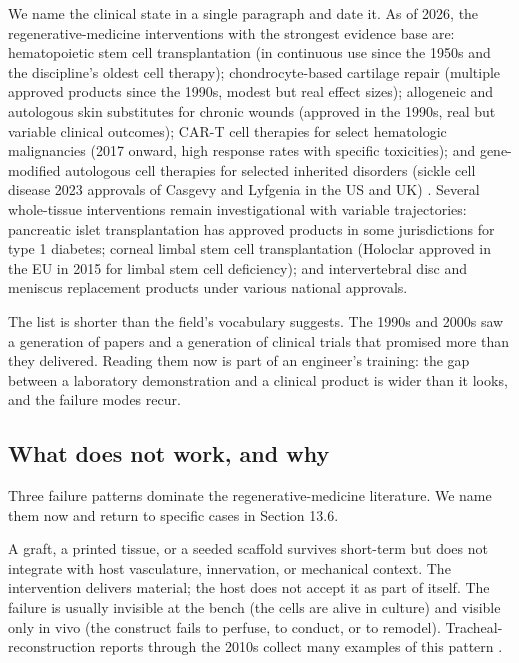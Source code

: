 We name the clinical state in a single paragraph and date it. As of
2026, the regenerative-medicine interventions with the strongest
evidence base are: hematopoietic stem cell transplantation (in
continuous use since the 1950s and the discipline's oldest cell
therapy); chondrocyte-based cartilage repair (multiple approved
products since the 1990s, modest but real effect sizes); allogeneic and
autologous skin substitutes for chronic wounds (approved in the 1990s,
real but variable clinical outcomes); CAR-T cell therapies for select
hematologic malignancies (2017 onward, high response rates with
specific toxicities); and gene-modified autologous cell therapies for
selected inherited disorders (sickle cell disease 2023 approvals of
Casgevy and Lyfgenia in the US and UK)
\cite{paper:v6c13-frangoul-casgevy-2021, paper:v6c13-june-cart-2018}.
Several whole-tissue interventions remain investigational with variable
trajectories: pancreatic islet transplantation has approved products in
some jurisdictions for type 1 diabetes; corneal limbal stem cell
transplantation (Holoclar approved in the EU in 2015 for limbal stem
cell deficiency); and intervertebral disc and meniscus replacement
products under various national approvals.

The list is shorter than the field's vocabulary suggests. The 1990s and
2000s saw a generation of papers and a generation of clinical trials
that promised more than they delivered. Reading them now is part of an
engineer's training: the gap between a laboratory demonstration and a
clinical product is wider than it looks, and the failure modes recur.

\subsection{What does not work, and why}

Three failure patterns dominate the regenerative-medicine literature.
We name them now and return to specific cases in Section 13.6.

 A graft, a printed tissue, or a
seeded scaffold survives short-term but does not integrate with host
vasculature, innervation, or mechanical context. The intervention
delivers material; the host does not accept it as part of itself. The
failure is usually invisible at the bench (the cells are alive in
culture) and visible only in vivo (the construct fails to perfuse, to
conduct, or to remodel). Tracheal-reconstruction reports through the
2010s collect many examples of this pattern
\cite{paper:v6c13-deluca-tissue-failure}.

